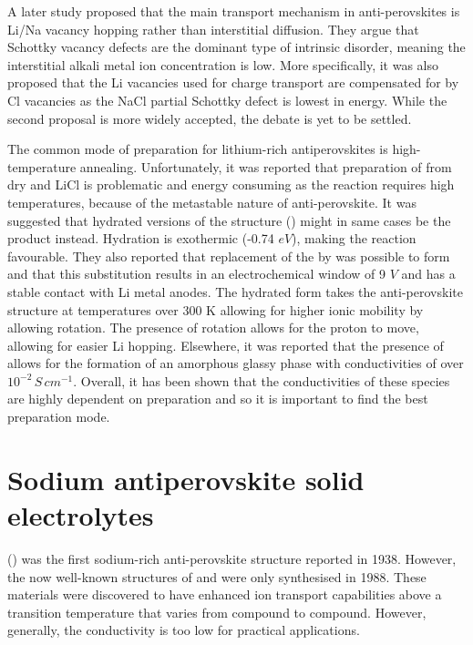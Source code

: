 \documentclass[10pt,a4paper, titlepage]{article}
\begin{document}
A later study proposed that the main transport mechanism in anti-perovskites is Li/Na vacancy hopping rather than interstitial diffusion. 
They argue that Schottky vacancy defects are the dominant type of intrinsic disorder, meaning the interstitial alkali metal ion concentration is low. \cite{RN55, RN59, RN60}
More specifically, it was also proposed that the Li vacancies used for charge transport are compensated for by Cl vacancies as the NaCl partial Schottky defect is lowest in energy. \cite{RN58} 
While the second proposal is more widely accepted, the debate is yet to be settled.

The common mode of preparation for lithium-rich antiperovskites is high-temperature annealing.
Unfortunately, it was reported that preparation of from dry  and LiCl is problematic and energy consuming as the reaction requires high temperatures, because of the metastable nature of  anti-perovskite. 
It was suggested that hydrated versions of the structure () might in same cases be the product instead. 
Hydration is exothermic (-0.74 $eV$), making the reaction favourable. \cite{RN61}
They also reported that replacement of the  by  was possible to form  and that this substitution results in an electrochemical window of 9 $V$ and has a stable contact with Li metal anodes. \cite{RN62}
The hydrated form takes the anti-perovskite structure at temperatures over 300 K allowing for higher ionic mobility by allowing  rotation. 
The presence of  rotation allows for the proton to move, allowing for easier Li hopping. \cite{RN62}
Elsewhere, it was reported that the presence of  allows for the formation of an amorphous glassy phase with conductivities of over $10^{-2} \, S \, cm^{-1}$. \cite{RN40, RN63}
Overall, it has been shown that the conductivities of these species are highly dependent on preparation and so it is important to find the best preparation mode. 

\section{Sodium antiperovskite solid electrolytes}

 () was the first sodium-rich anti-perovskite structure reported in 1938. \cite{RN64} 
However, the now well-known structures of  and  were only synthesised in 1988. \cite{RN65}
These materials were discovered to have enhanced ion transport capabilities above a transition temperature that varies from compound to compound. 
However, generally, the conductivity is too low for practical applications. 
 
\end{document}
